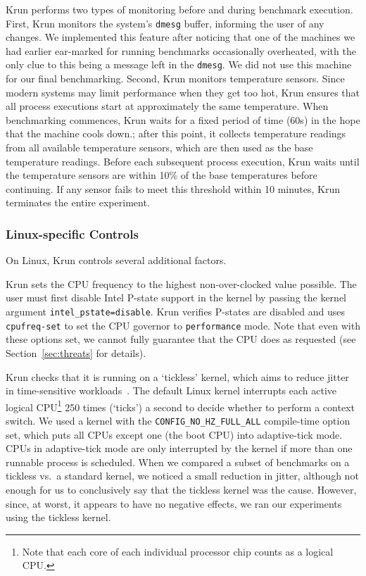 \documentclass[a4paper,UKenglish]{lipics}
\newcommand{\krun}{Krun\xspace}
\begin{document}
\krun performs two types of monitoring before and during benchmark execution.
First, \krun monitors the system's \texttt{dmesg} buffer, informing the user of
any changes. We implemented this feature after noticing that one of the
machines we had earlier ear-marked for running benchmarks occasionally
overheated, with the only clue to this being a message left in the \texttt{dmesg}.
We did not use this machine for our final benchmarking.
Second, \krun monitors temperature sensors. Since modern systems may limit
performance when they get too hot, \krun ensures that all process executions
start at approximately the same temperature. When benchmarking commences,
\krun waits for a fixed period of time (60s) in the hope that the machine
cools down.; after this point, it collects temperature
readings from all available temperature sensors, which are then used as
the base temperature readings. Before each subsequent process execution, \krun
waits until the temperature sensors are within 10\%{} of the base temperatures
before continuing. If any sensor fails to meet this threshold
within 10 minutes, \krun terminates the entire experiment.


\subsubsection{Linux-specific Controls}

On Linux, \krun controls several additional factors.

\krun sets the CPU frequency to the highest non-over-clocked value possible.
The user must first disable Intel P-state support in
the kernel by passing the kernel argument \texttt{intel\_pstate=disable}.
\krun verifies P-states are disabled and uses \texttt{cpufreq-set} to set
the CPU governor to \texttt{performance} mode. Note that even with these
options set, we cannot fully guarantee that the CPU does as requested
(see Section~\ref{sec:threats} for details).

\krun checks that it is running on a `tickless' kernel, which aims to reduce
jitter in time-sensitive workloads~\cite{tickless}. The default
Linux kernel interrupts each active logical CPU\footnote{Note that each core of
each individual processor chip counts as a logical CPU.} 250 times (`ticks') a second to
decide whether to perform a context switch. We used a kernel with the
\texttt{CONFIG\_NO\_HZ\_FULL\_ALL} compile-time option set, which puts
all CPUs except one (the boot CPU) into adaptive-tick mode.
CPUs in adaptive-tick mode are only interrupted by the kernel if more than
one runnable process is scheduled.
When we compared a subset of benchmarks on a tickless vs.~a standard
kernel, we noticed a small reduction in jitter, although not enough for us to
conclusively say that the tickless kernel was the cause. However,
since, at worst, it appears to have no negative effects, we ran our experiments
using the tickless kernel.
\end{document}
